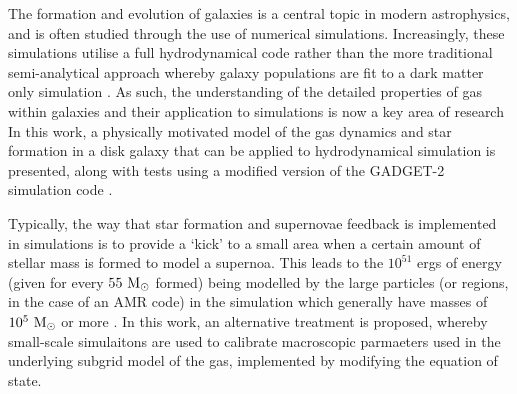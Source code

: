 The formation and evolution of galaxies is a central topic in modern astrophysics, and is often studied through the use of numerical simulations.
Increasingly, these simulations utilise a full hydrodynamical code \citep{schaye_eagle_2015,vogelsberger_introducing_2014} rather than the more traditional semi-analytical approach whereby galaxy populations are fit to a dark matter only simulation \citep{baugh_primer_2006, bower_breaking_2006}.
As such, the understanding of the detailed properties of gas within galaxies and their application to simulations is now a key area of research
In this work, a physically motivated model of the gas dynamics and star formation in a disk galaxy that can be applied to hydrodynamical simulation is presented, along with tests using a modified version of the GADGET-2 simulation code \citep{springel_cosmological_2003, springel_cosmological_2005}.

Typically, the way that star formation and supernovae feedback is implemented in simulations is to provide a `kick' to a small area when a certain amount of stellar mass is formed to model a supernoa.
This leads to the $10^{51}$ ergs of energy (given for every $55 ~\mathrm{M}_{\odot}$ formed) being modelled by the large particles (or regions, in the case of an AMR code) in the simulation which generally have masses of $10^5 ~\mathrm{M}_{\odot}$ or more \citep{tasker_simulation_2006, joung_dependence_2009, hummels_adaptive_2012, hopkins_meaning_2013, becerra_interstellar_2014}.
In this work, an alternative treatment is proposed, whereby small-scale simulaitons are used to calibrate macroscopic parmaeters used in the underlying subgrid model of the gas, implemented by modifying the equation of state.
